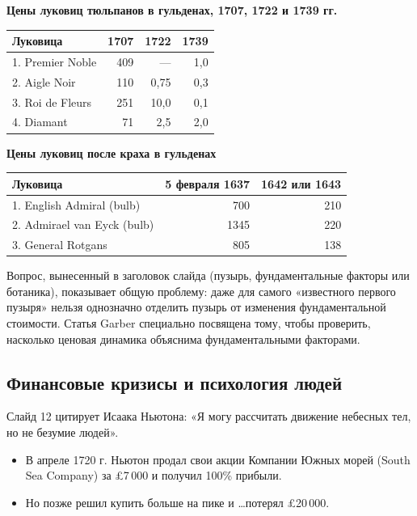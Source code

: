 \documentclass[10pt,a4paper]{article}
\begin{document}
\begin{center}
\textbf{Цены луковиц тюльпанов в гульденах, 1707, 1722 и 1739 гг.}\\[3pt]
\begin{tabular}{lrrr}
\toprule
\textbf{Луковица} & \textbf{1707} & \textbf{1722} & \textbf{1739}\\
\midrule
1. Premier Noble & 409 & --- & 1,0\\
2. Aigle Noir & 110 & 0,75 & 0,3\\
3. Roi de Fleurs & 251 & 10,0 & 0,1\\
4. Diamant & 71 & 2,5 & 2,0\\
\bottomrule
\end{tabular}

\vspace{8pt}
\textbf{Цены луковиц после краха в гульденах}\\[3pt]
\begin{tabular}{lrr}
\toprule
\textbf{Луковица} & \textbf{5 февраля 1637} & \textbf{1642 или 1643}\\
\midrule
1. English Admiral (bulb) & 700 & 210\\
2. Admirael van Eyck (bulb) & 1345 & 220\\
3. General Rotgans & 805 & 138\\
\bottomrule
\end{tabular}
\end{center}

\begin{intuition}
Вопрос, вынесенный в заголовок слайда (пузырь, фундаментальные факторы или ботаника), показывает общую проблему: даже для самого «известного первого пузыря» нельзя однозначно отделить пузырь от изменения фундаментальной стоимости. Статья Garber специально посвящена тому, чтобы проверить, насколько ценовая динамика объяснима фундаментальными факторами.
\end{intuition}

\subsection{Финансовые кризисы и психология людей}

Слайд 12 цитирует Исаака Ньютона: «Я могу рассчитать движение небесных тел, но не безумие людей».
\begin{itemize}[leftmargin=1.3em]
\item В апреле 1720 г. Ньютон продал свои акции Компании Южных морей (South Sea Company) за £7\,000 и получил 100\% прибыли.
\item Но позже решил купить больше на пике и \ldots потерял £20\,000.
\end{itemize}
\end{document}
